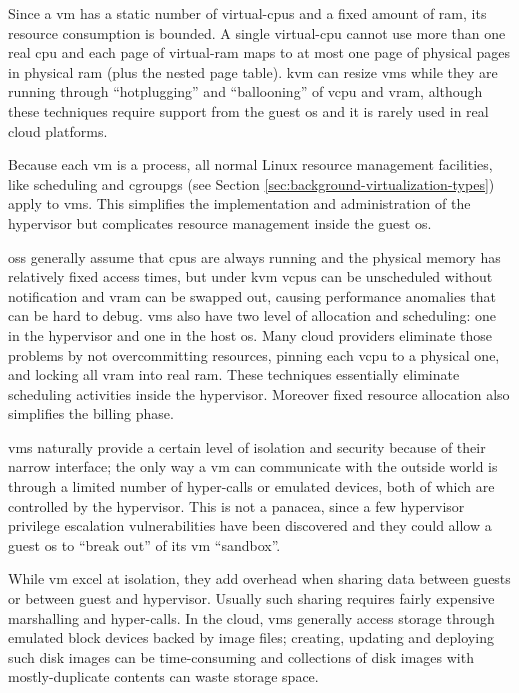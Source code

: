 Since a \ac{vm} has a static number of virtual-\acs{cpu}s and a fixed amount of \acs{ram}, its resource
consumption is bounded. A single virtual-\acs{cpu} cannot use more than one real \acs{cpu} and each page
of virtual-\acs{ram} maps to at most one page of physical pages in physical \acs{ram} (plus the nested page
table). \ac{kvm} can resize \ac{vm}s while they are running through ``hotplugging'' and ``ballooning''
of v\acs{cpu} and v\acs{ram}, although these techniques require support from the guest \acs{os} and it
is rarely used in real cloud platforms.

Because each \ac{vm} is a process, all normal Linux resource management facilities, like scheduling and
cgroupgs (see Section \ref{sec:background-virtualization-types}) apply to \ac{vm}s. This simplifies the
implementation and administration of the hypervisor but complicates resource management inside the guest
\acs{os}.

\acs{os}s generally assume that \acs{cpu}s are always running and the physical memory has relatively
fixed access times, but under \ac{kvm} v\acs{cpu}s can be unscheduled without notification and v\acs{ram} can
be swapped out, causing performance anomalies that can be hard to debug. \ac{vm}s also have two level
of allocation and scheduling: one in the hypervisor and one in the host \acs{os}. Many cloud providers
eliminate those problems by not overcommitting resources, pinning each v\acs{cpu} to a physical one,
and locking all v\acs{ram} into real \acs{ram}. These techniques essentially eliminate scheduling
activities inside the hypervisor. Moreover fixed resource allocation also simplifies the billing
phase.

\ac{vm}s naturally provide a certain level of isolation and security because of their narrow interface;
the only way a \ac{vm} can communicate with the outside world is through a limited number of hyper-calls
or emulated devices, both of which are controlled by the hypervisor. This is not a panacea, since a few
hypervisor privilege escalation vulnerabilities have been discovered and they could allow a guest \acs{os}
to ``break out'' of its \ac{vm} ``sandbox''.

While \ac{vm} excel at isolation, they add overhead when sharing data between guests or between guest
and hypervisor. Usually such sharing requires fairly expensive marshalling and hyper-calls. In the
cloud, \ac{vm}s generally access storage through emulated block devices backed by image files; creating,
updating and deploying such disk images can be time-consuming and collections of disk images with
mostly-duplicate contents can waste storage space.

